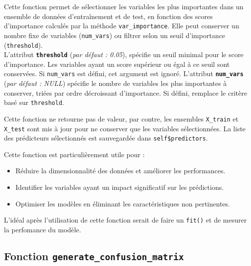 \documentclass{rapport}
\begin{document}
Cette fonction permet de sélectionner les variables les plus importantes dans un ensemble de données d'entraînement et de test, en fonction des scores d'importance calculés par la méthode \texttt{var\_importance}. Elle peut conserver un nombre fixe de variables (\texttt{num\_vars}) ou filtrer selon un seuil d'importance (\texttt{threshold}).\\
L'attribut \textbf{\texttt{threshold}} (\textit{par défaut : 0.05}), spécifie un seuil minimal pour le score d'importance. Les variables ayant un score supérieur ou égal à ce seuil sont conservées. Si \texttt{num\_vars} est défini, cet argument est ignoré. L'attribut \textbf{\texttt{num\_vars}} (\textit{par défaut : NULL}) spécifie le nombre de variables les plus importantes à conserver, triées par ordre décroissant d'importance. Si défini, remplace le critère basé sur \texttt{threshold}.

Cette fonction ne retourne pas de valeur, par contre, les ensembles \texttt{X\_train} et \texttt{X\_test} sont mis à jour pour ne conserver que les variables sélectionnées.
La liste des prédicteurs sélectionnés est sauvegardée dans \texttt{self\$predictors}.


Cette fonction est particulièrement utile pour :
\begin{itemize}
    \item Réduire la dimensionnalité des données et améliorer les performances.
    \item Identifier les variables ayant un impact significatif sur les prédictions.
    \item Optimiser les modèles en éliminant les caractéristiques non pertinentes.
\end{itemize}
L'idéal après l'utilisation de cette fonction serait de faire un \texttt{fit()} et de mesurer la perfomance du modèle.


\subsection{Fonction \texttt{generate\_confusion\_matrix}}
\end{document}
